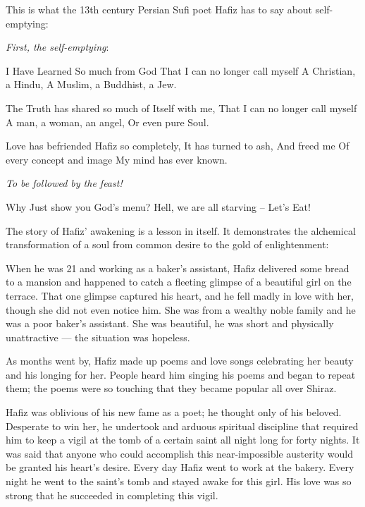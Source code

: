 This is what the 13th century Persian Sufi poet Hafiz has to say about self-emptying:

\textit{First, the self-emptying}:

\begin{quotex}
I Have Learned
So much from God
That I can no longer call myself
A Christian, a Hindu,
A Muslim, a Buddhist, a Jew.

The Truth has shared so much of Itself with me,
That I can no longer call myself
A man, a woman, an angel,
Or even pure Soul.

Love has befriended Hafiz so completely,
It has turned to ash,
And freed me
Of every concept and image
My mind has ever known.
\end{quotex}

\textit{To be followed by the feast!}

\begin{quotex}
Why
Just show you God’s menu?
Hell, we are all starving –
Let’s Eat!
\end{quotex}

The story of Hafiz’ awakening is a lesson in itself. It demonstrates the alchemical transformation of a soul from common desire to the gold of enlightenment:

When he was 21 and working as a baker’s assistant, Hafiz delivered some bread to a mansion and happened to catch a fleeting glimpse of a beautiful girl on the terrace. That one glimpse captured his heart, and he fell madly in love with her, though she did not even notice him. She was from a wealthy noble family and he was a poor baker’s assistant. She was beautiful, he was short and physically unattractive — the situation was hopeless.

As months went by, Hafiz made up poems and love songs celebrating her beauty and his longing for her. People heard him singing his poems and began to repeat them; the poems were so touching that they became popular all over Shiraz.

Hafiz was oblivious of his new fame as a poet; he thought only of his beloved. Desperate to win her, he undertook and arduous spiritual discipline that required him to keep a vigil at the tomb of a certain saint all night long for forty nights. It was said that anyone who could accomplish this near-impossible austerity would be granted his heart’s desire. Every day Hafiz went to work at the bakery. Every night he went to the saint’s tomb and stayed awake for this girl. His love was so strong that he succeeded in completing this vigil.


